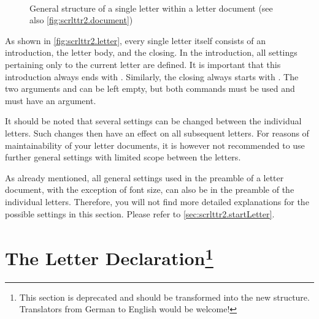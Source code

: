 \begin{figure}
\\
\caption{General structure of a single letter within a letter
document (see also \autoref{fig:scrlttr2.document})}
\label{fig:scrlttr2.letter}
\end{figure}

As shown in \autoref{fig:scrlttr2.letter}, every single letter itself
consists of an introduction, the letter body, and the closing. In the
introduction, all settings pertaining only to the current letter are
defined. It is important that this introduction always ends with
. Similarly, the closing always starts with
. The two arguments  and 
can be left empty, but both commands must be used and must have an
argument.

\begin{Explain}
  It should be noted that several settings can be changed between the
  individual letters. Such changes then have an effect on all
  subsequent letters. For reasons of maintainability of your letter
  documents, it is however not recommended to use further general
  settings with limited scope between the letters.
\end{Explain}

As already mentioned, all general settings used in the preamble of a
letter document, with the exception of font size, can also be in the
preamble of the individual letters. Therefore, you will not find more
detailed explanations for the possible settings in this
section. Please refer to \autoref{sec:scrlttr2.startLetter}.


\section{The Letter Declaration\protect\footnote{This section is
  deprecated and should be transformed into the new structure. Translators
  from German to English would be welcome!}}
\label{sec:scrlttr2.startLetter}

